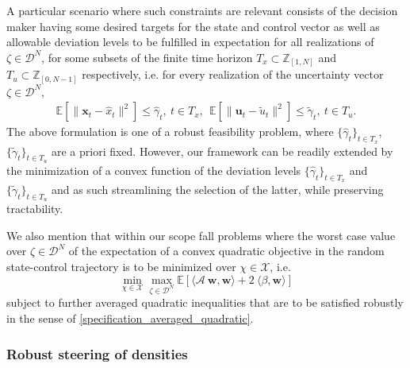 \documentclass[letterpaper,11pt]{article}
\begin{document}
A particular scenario where such constraints are relevant consists of the decision maker having some desired targets for the state and control vector as well as allowable deviation levels to be fulfilled 
in expectation for all realizations of $ \zeta \in \mathscr{D}^N$,
for some subsets of the finite time horizon $   T_x \subset \mathbb{Z}_{[1,N]}$ and $   T_u \subset \mathbb{Z}_{[0,N-1]}$
respectively, i.e. for every realization of the uncertainty vector $ \zeta \in \mathscr{D}^N$,
\begin{eqnarray*}
	\mathbb{E}[\| \mathbf{x}_t - \hat{x}_t \|^2]  \leq \hat{\gamma}_t, ~  t \in T_x, ~~
	\mathbb{E}[\| \mathbf{u}_t - \tilde{u}_t \|^2]  \leq \tilde{\gamma}_t, ~  t \in T_u.
\end{eqnarray*}
The above formulation is one of a robust feasibility problem,  where 
$\{\hat{\gamma}_t\}_{t \in T_x}$, $\{ \tilde{\gamma}_t\}_{t \in T_u}$ are a priori fixed. However, 
our framework can be readily extended by the minimization of a convex function of the deviation levels $\{\hat{\gamma}_t\}_{
	t \in T_x}$ and 
$\{ \tilde{\gamma}_t\}_{t \in T_u}$ and as such streamlining the selection
of the latter,  while preserving tractability.


We also mention that within our scope fall problems where the
worst case value over $\zeta  \in \mathscr{D}^N$ of the 
expectation of a convex quadratic objective in the random state-control trajectory is to be  minimized over $ \chi \in \mathcal{X}$, i.e.
$$
\min_{ \chi \in \mathcal{X}} \max_{\zeta  \in \mathscr{D}^N }
\mathbb{E}[\langle \mathcal{A} ~  \mathbf{w},   \mathbf{w} \rangle + 2 ~ \langle \beta,  \mathbf{w} \rangle ]
$$
subject to further averaged quadratic inequalities that are to be satisfied robustly in the sense of \eqref{specification_averaged_quadratic}.

\subsubsection{Robust steering of densities}
\end{document}
